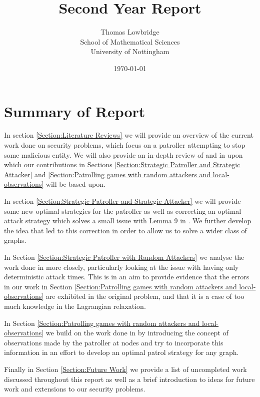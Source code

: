\documentclass[a4paper,10pt]{article}
\title{Second Year Report}
\date{\today}
\author{Thomas Lowbridge \\ School of Mathematical Sciences \\ University of Nottingham}
\theoremstyle{definition}
\theoremstyle{definition}
\theoremstyle{remark}
\theoremstyle{definition}
\begin{document}
\pagestyle{empty}
{
  \renewcommand{\thispagestyle}[1]{}
  \maketitle
  \tableofcontents  
}
\clearpage
\pagestyle{plain}


\setlength{\parindent}{0pt}
\setlength{\parskip}{1em}

\newpage
{}

\section{Summary of Report}
In section \ref{Section:Literature Reviews} we will provide an overview of the current work done on security problems, which focus on a patroller attempting to stop some malicious entity. We will also provide an in-depth review of \cite{Alpern2011} and \cite{Lin2013} in upon which our contributions in Sections \ref{Section:Strategic Patroller and Strategic Attacker} and \ref{Section:Patrolling games with random attackers and local-observations} will be based upon.

In section \ref{Section:Strategic Patroller and Strategic Attacker} we will provide some new optimal strategies for the patroller as well as correcting an optimal attack strategy which solves a small issue with Lemma 9 in \cite{Alpern2011}. We further develop the idea that led to this correction in order to allow us to solve a wider class of graphs.

In Section \ref{Section:Strategic Patroller with Random Attackers} we analyse the work done in \cite{Alpern2011} more closely, particularly looking at the issue with having only deterministic attack times. This is in an aim to provide evidence that the errors in our work in Section \ref{Section:Patrolling games with random attackers and local-observations} are exhibited in the original problem, and that it is a case of too much knowledge in the Lagrangian relaxation.

In Section \ref{Section:Patrolling games with random attackers and local-observations} we build on the work done in \cite{Lin2013} by introducing the concept of observations made by the patroller at nodes and try to incorporate this information in an effort to develop an optimal patrol strategy for any graph.

Finally in Section \ref{Section:Future Work} we provide a list of uncompleted work discussed throughout this report as well as a brief introduction to ideas for future work and extensions to our security problems. 
\end{document}
